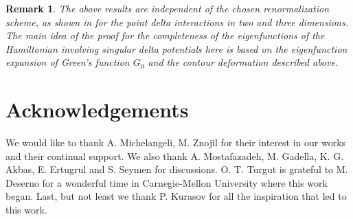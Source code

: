 \documentclass[amsmath,amssymb,14pt]{article}
\numberwithin{equation}{section}
\newtheorem{myremark}[mytheo]{Remark}
\begin{document}

\begin{myremark}
The above results are independent of the chosen renormalization scheme, as shown in \cite{DuttaRoy} for the point delta interactions in two and three dimensions. The main idea of the proof for the completeness of the eigenfunctions of the Hamiltonian involving singular delta potentials here is based on the eigenfunction expansion of Green's function $G_0$ and the contour deformation described above.    
\end{myremark}




\section{Acknowledgements}
We would like to thank A. Michelangeli, M. Znojil for their interest in our works and their continual support. We also thank A. Mostafazadeh, M. Gadella, K. G. Akbas, E. Ertugrul and S. Seymen for discussions. O. T. Turgut is grateful to M. Deserno for a wonderful time in Carnegie-Mellon University where this work began.
Last, but not least we thank 
P. Kurasov for all the inspiration that led to this work.
\end{document}
